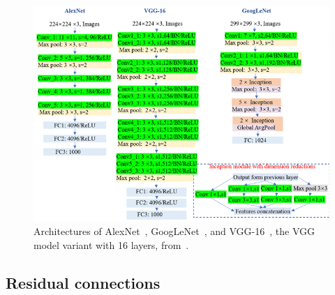 \documentclass[english,twoside,openright]{UH_DS_MSc}
\begin{document}
\begin{figure}[h]
    \centering
    \includegraphics*[scale=0.6]{images/famouscnns.png}
    \caption{Architectures of AlexNet~\cite{alexnet}, GoogLeNet~\cite{googlelenet}, and VGG-16~\cite{vgg}, the 
    VGG model variant with 16 layers, from~\cite{zhangImagebasedMethodsDietary2023}.}
    \label{image:famouscnns}
\end{figure}

\subsection{Residual connections}
\end{document}
